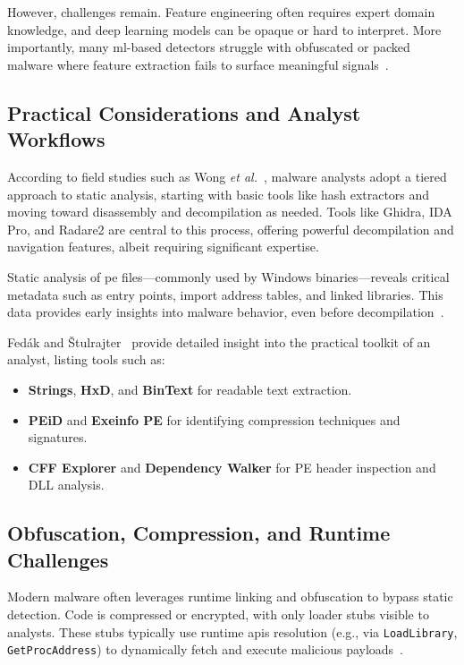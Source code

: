 However, challenges remain. Feature engineering often requires expert domain knowledge, and deep
learning models can be opaque or hard to interpret. More importantly, many \gls{ml}-based detectors
struggle with obfuscated or packed malware where feature extraction fails to surface meaningful
signals~\cite{cassanova2022systematic}.

\subsection{Practical Considerations and Analyst Workflows}\label{subsec:StaticAnalystWorkflows}
According to field studies such as Wong \emph{et al.}~\cite{wong2021practice}, malware analysts
adopt a tiered approach to static analysis, starting with basic tools like hash extractors and
moving toward disassembly and \gls{decompilation} as needed. Tools like Ghidra, IDA Pro, and
Radare2 are central to this process, offering powerful \gls{decompilation} and navigation features,
albeit requiring significant expertise.

Static analysis of \gls{pe} files—commonly used by Windows binaries—reveals critical metadata such
as entry points, import address tables, and linked libraries. This data provides early insights
into malware behavior, even before \gls{decompilation}~\cite{fedak2020fundamentals}.

Fedák and Štulrajter~\cite{fedak2020fundamentals} provide detailed insight into the practical
toolkit of an analyst, listing tools such as:
\begin{itemize}
	\item \textbf{Strings}, \textbf{HxD}, and \textbf{BinText} for readable text extraction.
	\item \textbf{PEiD} and \textbf{Exeinfo PE} for identifying compression techniques and signatures.
	\item \textbf{CFF Explorer} and \textbf{Dependency Walker} for PE header inspection and DLL analysis.
\end{itemize}

\subsection{Obfuscation, Compression, and Runtime Challenges}\label{subsec:StaticObfuscationRuntime}
Modern malware often leverages runtime linking and obfuscation to bypass static detection. Code is
compressed or encrypted, with only loader stubs visible to analysts. These stubs typically use
runtime \glspl{api} resolution (e.g., via \texttt{LoadLibrary}, \texttt{GetProcAddress}) to
dynamically fetch and execute malicious payloads~\cite{fedak2020fundamentals}.

